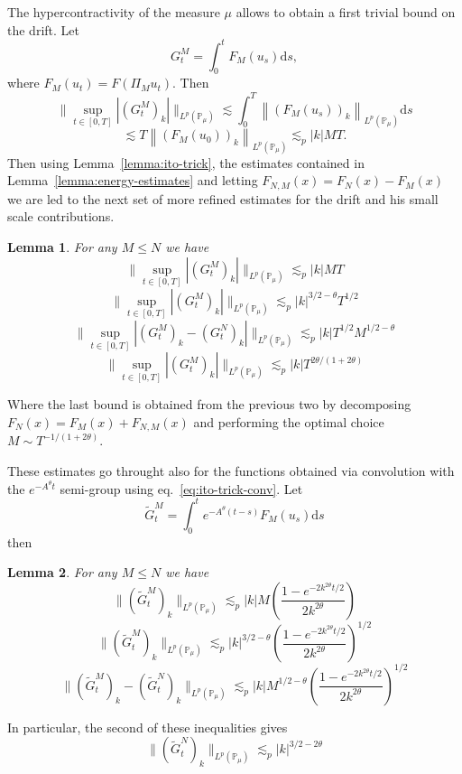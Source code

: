 \documentclass[11pt,a4paper,draft,reqno]{amsart}
\newtheorem{lemma}{Lemma}
\newcommand{\PP}{\mathbb{P}}
\newcommand{\dd}{\mathrm{d}}
\begin{document}
The hypercontractivity of the measure $\mu$ allows to obtain a first trivial bound on the drift. Let 
$$
G^M_t = \int_0^t F_{M}(u_s) \dd  s,
$$
where $F_M(u_t) = F(\Pi_M u_t)$. Then
$$
\|\sup_{t\in[0,T]}\left| (G^M_t)_k \right| \|_{L^p(\PP_\mu)}
\lesssim 
\int_0^T \left\| (F_{M}(u_s))_k \right\|_{L^p(\PP_\mu)}\dd  s 
$$
$$\lesssim 
T \left\| (F_{M}(u_0))_k  \right\|_{L^p(\PP_\mu)}
\lesssim_p 
  |k| M T.
$$
Then using Lemma~\ref{lemma:ito-trick}, the estimates contained in Lemma~\ref{lemma:energy-estimates} and letting  $F_{N,M}(x) = F_N(x)-F_M(x)$ we are led to the next set of more refined estimates for the drift and his small scale contributions.
\begin{lemma} For any $M\le N$ we have
\begin{equation}
\label{eq:basic-est-1}
\|\sup_{t\in[0,T]} \left|(G^M_t)_k\right| \|_{L^p(\PP_\mu)}\lesssim_p |k| M T
\end{equation}
\begin{equation}
\label{eq:basic-est-2}
\|\sup_{t\in[0,T]} \left|(G^M_t)_k\right| \|_{L^p(\PP_\mu)}\lesssim_p |k|^{3/2-\theta} T^{1/2}
\end{equation}
\begin{equation}
\label{eq:basic-est-3}
\|\sup_{t\in[0,T]}\left|(G^M_t)_k-(G^N_t)_k\right| \|_{L^p(\PP_\mu)}\lesssim_p |k| T^{1/2} M^{1/2-\theta}
\end{equation}
\begin{equation}
\label{eq:basic-est-4}
\|\sup_{t\in[0,T]}\left|(G^M_t)_k\right| \|_{L^p(\PP_\mu)}\lesssim_p   |k| T^{2\theta/(1+2\theta)}
\end{equation}
\end{lemma}

Where the last bound is obtained from the previous two by decomposing $F_N(x) = F_M(x)+F_{N,M}(x)$ and performing the optimal choice $M \sim T^{-1/(1+2\theta)}$.

These estimates go throught also for the functions obtained via convolution with the $e^{-A^\theta t}$ semi-group using eq.~\eqref{eq:ito-trick-conv}. Let
$$
\tilde G^M_t = \int_0^t e^{-A^\theta (t-s)} F_{M}(u_s) \dd  s
$$
then
\begin{lemma} For any $M\le N$ we have
\begin{equation}
\label{eq:basic-est-1-conv}
\|(\tilde G^M_t)_k\|_{L^p(\PP_\mu)}\lesssim_p |k| M \left(\frac{1-e^{-2k^{2\theta} t/2}}{2k^{2\theta}}\right)
\end{equation}
\begin{equation}
\label{eq:basic-est-2-conv}
\|(\tilde G^M_t)_k\|_{L^p(\PP_\mu)}\lesssim_p |k|^{3/2-\theta} \left(\frac{1-e^{-2k^{2\theta} t/2}}{2k^{2\theta}}\right)^{1/2}
\end{equation}
\begin{equation}
\label{eq:basic-est-3-conv}
\|(\tilde G^M_t)_k-(\tilde G^N_t)_k\|_{L^p(\PP_\mu)}\lesssim_p |k| M^{1/2-\theta} \left(\frac{1-e^{-2k^{2\theta} t/2}}{2k^{2\theta}}\right)^{1/2}
\end{equation}
\end{lemma}
In particular, the second of these inequalities  gives
$$
\|(\tilde G^N_t)_k \|_{L^p(\PP_\mu)}\lesssim_p |k|^{3/2-2\theta} 
$$
\end{document}
